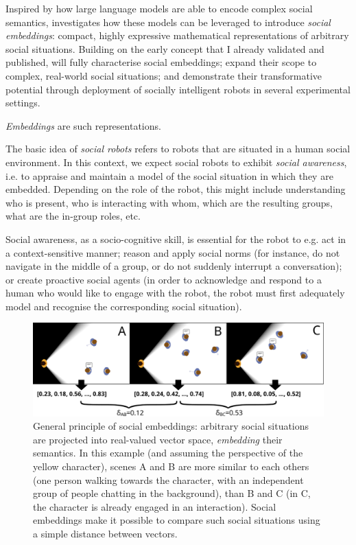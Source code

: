Inspired by how
large language models are able to encode complex social semantics, \project
investigates how these models can be leveraged to introduce \emph{social
embeddings}: compact, highly expressive mathematical representations of
arbitrary social situations.  Building on the early concept that I already
validated and published, \project will fully characterise social embeddings;
expand their scope to complex, real-world social situations; and demonstrate
their transformative potential through deployment of socially
intelligent robots in several experimental settings.


\project \emph{Embeddings} are such
representations.



The basic idea of \emph{social robots} refers to robots that are situated in a
human social environment. In this context, we expect social robots to exhibit
\emph{social awareness}, i.e. to appraise and maintain a model of the social
situation in which they are embedded. Depending on the role of the robot, this
might include understanding who is present, who is interacting with whom, which
are the resulting groups,  what are the in-group roles,  etc.

Social awareness, as a socio-cognitive skill, is essential for the robot to e.g.
act in a context-sensitive manner; reason and apply social norms (for instance,
do not navigate in the middle of a group, or do not suddenly interrupt a
conversation); or create proactive social agents (in order to acknowledge and
respond to a human who would like to engage with the robot, the robot must first
adequately model and recognise the corresponding social situation).


\begin{figure}[H]
    \centering
    \includegraphics[width=0.9\linewidth]{figs/social-embeddings}
    \caption{General principle of social embeddings: arbitrary social situations
    are projected into real-valued vector space, \emph{embedding} their
    semantics. In this example (and assuming the perspective of the yellow
    character), scenes A and B  are more similar to each others (one person walking towards the
    character, with an independent group of people chatting in the background),
    than B and C (in C, the character is already engaged in an interaction).
    Social embeddings make it possible to compare such social situations using
    a simple distance between vectors.}
    \label{fig:social-embeddings}
\end{figure}

